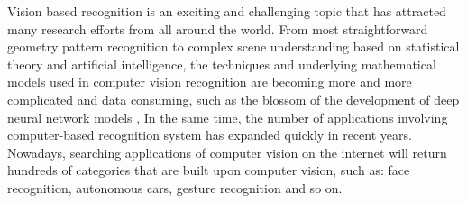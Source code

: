 \documentclass{iitthesis}
\begin{document}
Vision based recognition is an exciting and challenging topic that has attracted many research efforts from all around the world. From most straightforward geometry pattern recognition to complex scene understanding based on statistical theory and artificial intelligence, the techniques and underlying mathematical models used in computer vision recognition are becoming more and more complicated and data consuming, such as the blossom of the development of deep neural network models \cite{HK:89, HG:06, LY:98, LH:09}, In the same time, the number of applications involving computer-based recognition system has expanded quickly in recent years. Nowadays, searching applications of computer vision on the internet will return hundreds of categories that are built upon computer vision, such as: face recognition, autonomous cars, gesture recognition and so on.


\end{document}
